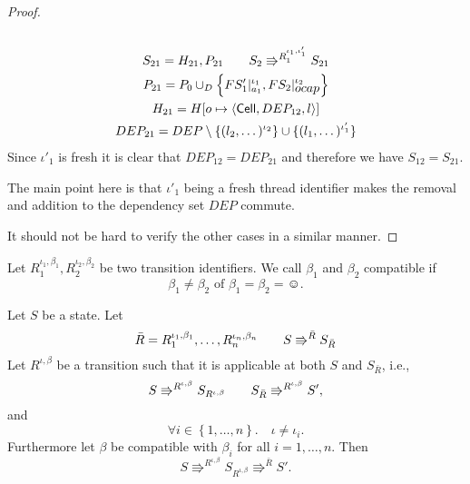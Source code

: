 \begin{proof}
\begin{description}
\begin{equation}
\begin{gathered}
        \end{gathered}
      \end{equation}
      \begin{equation} 
        \begin{gathered}
          S_{21} = H_{21}, P_{21} \quad\quad S_2 \Rrightarrow^{R_1^{\iota_1,
          \iota'_1}} S_{21}
          \\
          P_{21} = P_0 \cup_D \left\{ FS'_1|_{a_1}^{\iota_1},
          FS_2|_{\mbox{$ocap$}}^{\iota_2} \right\} \\
          H_{21} = H[o \mapsto \mbox{$\langle \mbox{$\mathsf{Cell}$}{}, DEP_{12}, l \rangle$}] \\ 
          DEP_{21} = DEP \setminus \{ (l_2, \dots)^{\iota_2} \} \cup \{ (l_1,
          \dots)^{\iota'_1} \} 
        \end{gathered}
      \end{equation}
      Since $\iota'_1$ is fresh it is clear that $DEP_{12} = DEP_{21}$ and
      therefore we have $S_{12} = S_{21}$.
      \begin{remark}
        The main point here is that $\iota'_1$ being a fresh thread identifier
        makes the removal and addition to the dependency set $DEP$ commute.
      \end{remark}
  \end{description}
  It should not be hard to verify the other cases in a similar manner.
\end{proof}

\begin{definition}
  Let $R_1^{\iota_1, \beta_1}, R_2^{\iota_2, \beta_2}$ be two transition
  identifiers. We call $\beta_1$ and $\beta_2$ compatible if
  \begin{equation*}
    \beta_1 \neq \beta_2 \text{ of } \beta_1 = \beta_2 = \smiley.
  \end{equation*}
\end{definition}

\begin{lemma} \label{lem:lemma2}
  Let $S$ be a state. Let
  \begin{equation*}
    \bar{R} = R_1^{\iota_1, \beta_1}, \dots, R_n^{\iota_n, \beta_n} \quad\quad
    S \Rrightarrow^{\bar{R}} S_{\bar{R}}
  \end{equation*}
  Let $R^{\iota, \beta}$ be a transition such that it is applicable at both $S$
  and $S_{\bar{R}}$, i.e.,
  \begin{equation*}
    S \Rrightarrow^{R^{\iota, \beta}} S_{R^{\iota, \beta}} \quad\quad
    S_{\bar{R}} \Rrightarrow^{R^{\iota, \beta}} S',
  \end{equation*}
  and
  \begin{equation} \label{eq:lemma2_1}
    \forall i \in \left\{ 1, \dots, n \right\}. \quad \iota \neq \iota_i  .
  \end{equation}
  Furthermore let $\beta$ be compatible with $\beta_i$ for all $i = 1, \dots,
  n$.
  Then
  \begin{equation*}
    S \Rrightarrow^{R^{\iota, \beta}} S_{R^{\iota, \beta}} \Rrightarrow^{\bar{R}} S'.
  \end{equation*}
\end{lemma}

